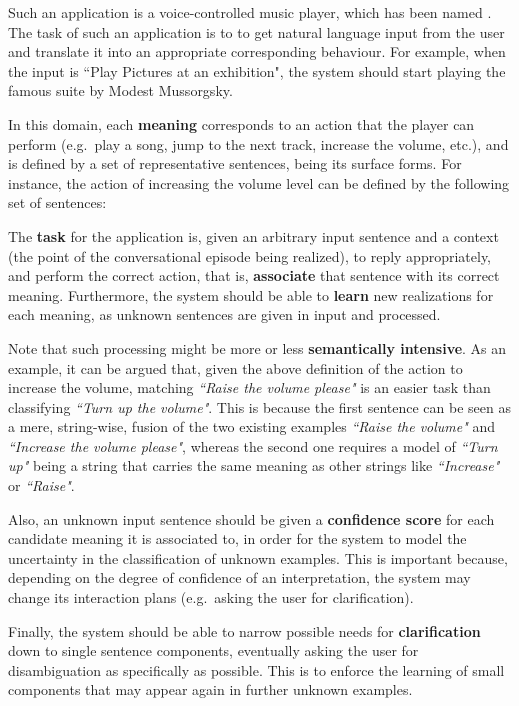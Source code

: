 Such an application is a voice-controlled music player, which has been named \textbf{\pname}. The task of such an application is to to get natural language input from the user and translate it into an appropriate corresponding behaviour. For example, when the input is ``Play Pictures at an exhibition", the system should start playing the famous suite by Modest Mussorgsky.

In this domain, each \textbf{meaning} corresponds to an action that the player can perform (e.g.\ play a song, jump to the next track, increase the volume, etc.), and is defined by a set of representative sentences, being its surface forms. For instance, the action of increasing the volume level can be defined by the following set of sentences:

The \textbf{task} for the application is, given an arbitrary input sentence and a context (the point of the conversational episode being realized), to reply appropriately, and perform the correct action, that is, \textbf{associate} that sentence with its correct meaning. Furthermore, the system should be able to \textbf{learn} new realizations for each meaning, as unknown sentences are given in input and processed.

Note that such processing might be more or less \textbf{semantically intensive}. As an example, it can be argued that, given the above definition of the action to increase the volume, matching \textit{``Raise the volume please"} is an easier task than classifying \textit{``Turn up the volume"}. This is because the first sentence can be seen as a mere, string-wise, fusion of the two existing examples \textit{``Raise the volume"} and \textit{``Increase the volume please"}, whereas the second one requires a model of \textit{``Turn up"} being a string that carries the same meaning as other strings like \textit{``Increase"} or \textit{``Raise"}.

Also, an unknown input sentence should be given a \textbf{confidence score} for each candidate meaning it is associated to, in order for the system to model the uncertainty in the classification of unknown examples. This is important because, depending on the degree of confidence of an interpretation, the system may change its interaction plans (e.g.\ asking the user for clarification).

Finally, the system should be able to narrow possible needs for \textbf{clarification} down to single sentence components, eventually asking the user for disambiguation as specifically as possible. This is to enforce the learning of small components that may appear again in further unknown examples.


